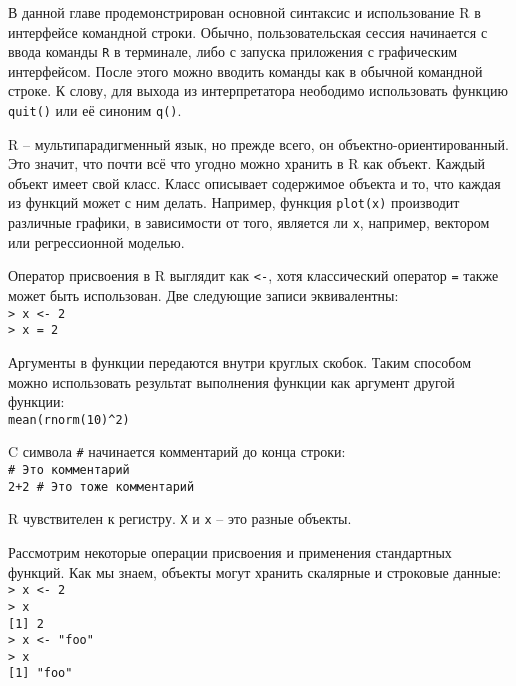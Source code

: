     В данной главе продемонстрирован основной синтаксис и использование R в интерфейсе 
    командной строки. Обычно, пользовательская сессия начинается с ввода команды \texttt{R} в 
    терминале, либо с запуска приложения с графическим интерфейсом. После этого можно вводить
    команды как в обычной командной строке. К слову, для выхода из интерпретатора неободимо
    использовать функцию \texttt{quit()} или её синоним \texttt{q()}.

    R -- мультипарадигменный язык, но прежде всего, он объектно-ориентированный. Это 
    значит, что почти всё что угодно можно хранить в R как объект. Каждый объект имеет 
    свой класс. Класс описывает содержимое объекта и то, что каждая из функций может с 
    ним делать. Например, функция \texttt{plot(x)} производит различные графики, в 
    зависимости от того, является ли \texttt{x}, например, вектором или регрессионной моделью. 
    
    Оператор присвоения в R выглядит как \texttt{<-}, хотя классический оператор 
    \texttt{=} также может быть использован. Две следующие записи эквивалентны: \\
    \indent \texttt{> x <- 2} \\
    \indent \texttt{> x = 2} 
    
    Аргументы в функции передаются внутри круглых скобок. Таким способом можно 
    использовать результат выполнения функции как аргумент другой функции: \\
    \indent \texttt{mean(rnorm(10)\^{}2)} 
    
    C символа \texttt{\#} начинается комментарий до конца строки: \\
    \indent \texttt{\# Это комментарий} \\
    \indent \texttt{2+2 \# Это тоже комментарий} 
    
    R чувствителен к регистру. \texttt{X} и \texttt{x} -- это разные объекты. 
    
    Рассмотрим некоторые операции присвоения и применения стандартных функций. Как мы
    знаем, объекты могут хранить скалярные и строковые данные: \\
    \indent \texttt{> x <- 2} \\
    \indent \texttt{> x} \\
    \indent \texttt{[1] 2} \\
    \indent \texttt{> x <- "foo"} \\
    \indent \texttt{> x } \\
    \indent \texttt{[1] "foo"} 
    
